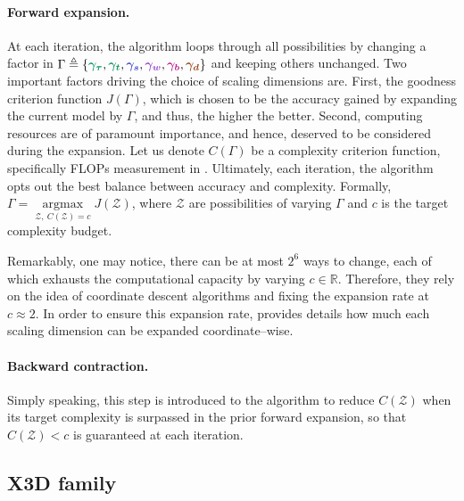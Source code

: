 \paragraph{Forward expansion.} At each iteration, the algorithm loops through all possibilities by changing a factor in $\Gamma \triangleq \{\xgtau, \xgt, \xgs, \xgw, \xgb, \xgd\}$ and keeping others unchanged. Two important factors driving the choice of scaling dimensions are.
First, the goodness criterion function $J(\Gamma)$, which is chosen to be the accuracy gained by expanding the current model by $\Gamma$, and thus, the higher the better.
Second, computing resources are of paramount importance, and hence, deserved to be considered during the expansion.
Let us denote $C(\Gamma)$ be a complexity criterion function, specifically FLOPs measurement in \cite{feichtenhofer2020x3d}.
Ultimately, each iteration, the algorithm opts out the best balance between accuracy and complexity. Formally, $\Gamma = \operatorname*{\arg\max}\limits_{\mathcal Z, ~C(\mathcal Z) = c} J(\mathcal Z)$, where $\mathcal Z$ are possibilities of varying $\Gamma$ and $c$ is the target complexity budget.

Remarkably, one may notice, there can be at most $2^6$ ways to change, each of which exhausts the computational capacity by varying $c \in \mathbb R$.
Therefore, they rely on the idea of coordinate descent algorithms \cite{Wright2015CoordinateDA} and fixing the expansion rate at $c \approx 2$.
In order to ensure this expansion rate, \cite{feichtenhofer2020x3d} provides details how much each scaling dimension can be expanded coordinate–wise.

\paragraph{Backward contraction.} Simply speaking, this step is introduced to the algorithm to reduce $C(\mathcal Z)$ when its target complexity is surpassed in the prior forward expansion, so that $C(\mathcal Z) < c$ is guaranteed at each iteration.


\subsection{X3D family}

